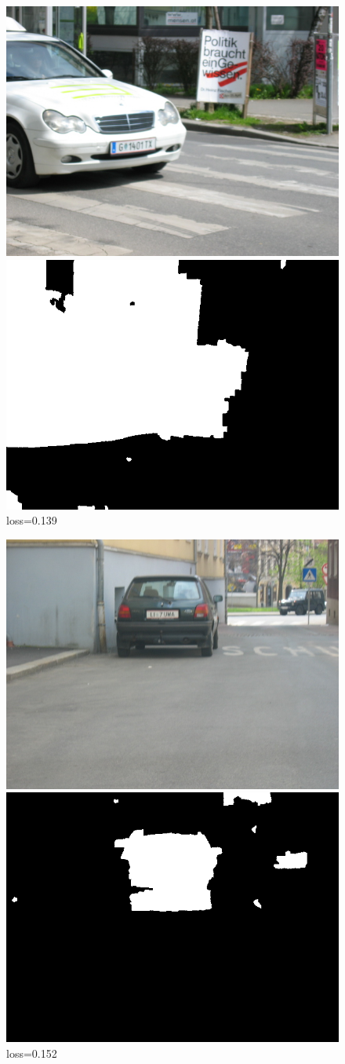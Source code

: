 \documentclass[russian,10pt,a4paper]{article}
\theoremstyle{definition}
\begin{document}
\begin{figure}[!h]
  \center
    \includegraphics[width=0.45\linewidth]{images/imgTrain_145}$ $
    \includegraphics[width=0.45\linewidth]{images/145_segm_res}
loss=0.139
\end{figure}


\begin{figure}[!h]
  \center
    \includegraphics[width=0.45\linewidth]{images/imgTrain_146}$ $
    \includegraphics[width=0.45\linewidth]{images/146_segm_res}
loss=0.152
\end{figure}
\end{document}
